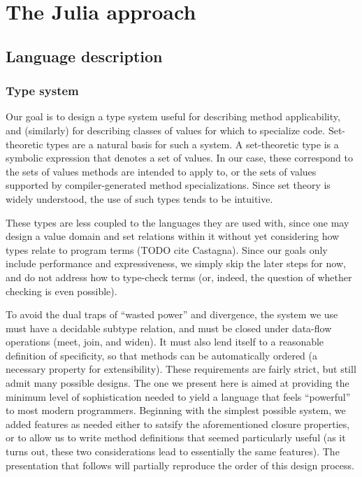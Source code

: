 \chapter{The Julia approach}

\section{Language description}

\subsection{Type system}

Our goal is to design a type system useful for describing method applicability,
and (similarly) for describing classes of values for which to specialize code.
Set-theoretic types are a natural basis for such a system.
A set-theoretic type is a symbolic expression that denotes a set of values.
In our case, these correspond to the sets of values methods are intended to apply
to, or the sets of values supported by compiler-generated method specializations.
Since set theory is widely understood, the use of such types tends to be intuitive.

These types
are less coupled to the languages they are used with, since one may design
a value domain and set relations within it without yet considering how types
relate to program terms (TODO cite Castagna). Since our goals only include
performance and expressiveness, we simply skip the later steps for now, and do
not address how to type-check terms (or, indeed, the question of whether checking
is even possible).

To avoid the dual traps of ``wasted power'' and divergence, the system we use
must have a decidable subtype relation, and must be closed under data-flow operations
(meet, join, and widen). It must also lend itself to a reasonable definition of
specificity, so that methods can be automatically ordered (a necessary property for
extensibility). These requirements are fairly strict, but still admit many possible
designs. The one we present here is aimed at providing the minimum level of
sophistication needed to yield a language that feels ``powerful'' to most modern
programmers. Beginning with the simplest possible system, we added features as
needed either to satsify the aforementioned closure properties, or to allow us to
write method definitions that seemed particularly useful (as it turns out, these
two considerations lead to essentially the same features). The presentation that
follows will partially reproduce the order of this design process.

